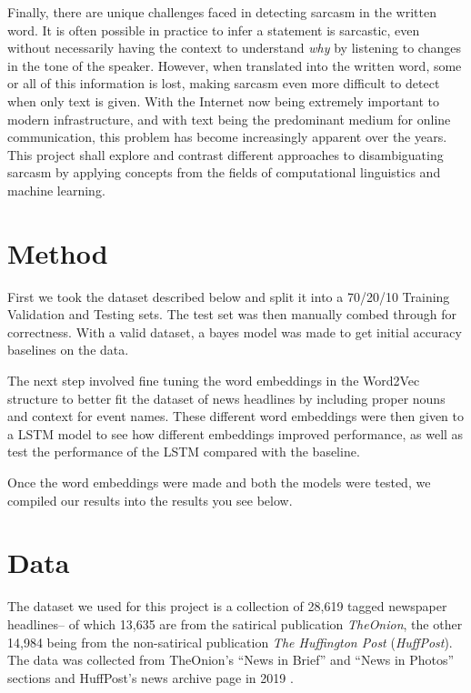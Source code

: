 \documentclass[11pt]{article}
\begin{document}
Finally, there are unique challenges faced in detecting sarcasm in the written
word. It is often possible in practice to infer a statement is sarcastic, even
without necessarily having the context to understand \textit{why} by listening
to changes in the tone of the speaker. However, when translated into the
written word, some or all of this information is lost, making sarcasm even more
difficult to detect when only text is given. With the Internet now being
extremely important to modern infrastructure, and with text being the
predominant medium for online communication, this problem has become
increasingly apparent over the years. This project shall explore and contrast
different approaches to disambiguating sarcasm by applying concepts from the
fields of computational linguistics and machine learning.

\section{Method}

First we took the dataset described below and split it into a 70/20/10 Training Validation and Testing sets. The test set was then manually combed through for correctness. With a valid dataset, a bayes model was made to get initial accuracy baselines on the data. 

The next step involved fine tuning the word embeddings in the Word2Vec structure to better fit the dataset of news headlines by including proper nouns and context for event names. These different word embeddings were then given to a LSTM model to see how different embeddings improved performance, as well as test the performance of the LSTM compared with the baseline.

Once the word embeddings were made and both the models were tested, we compiled our results into the results you see below.

\section{Data}

The dataset we used for this project is a collection of 28,619 tagged
newspaper headlines-- of which 13,635 are from the satirical publication
\textit{TheOnion}, the other 14,984 being from the non-satirical publication
\textit{The Huffington Post} (\textit{HuffPost}). The data was collected from
TheOnion's ``News in Brief'' and ``News in Photos'' sections and HuffPost's
news archive page in 2019
\cite{misra2023Sarcasm}.
\end{document}
